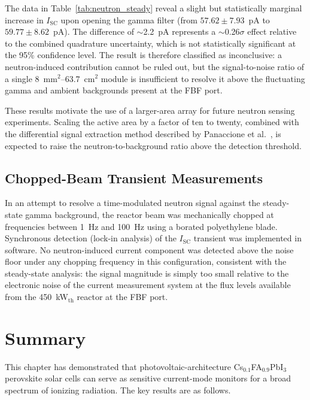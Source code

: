 The data in Table~\ref{tab:neutron_steady} reveal a slight but
statistically marginal increase in $I_{\mathrm{SC}}$ upon opening the gamma
filter (from $57.62 \pm 7.93$~pA to $59.77 \pm 8.62$~pA).  The
difference of $\sim$2.2~pA represents a $\sim$0.26$\sigma$ effect
relative to the combined quadrature uncertainty, which is not
statistically significant at the 95\% confidence level.  The result is
therefore classified as inconclusive: a neutron-induced contribution
cannot be ruled out, but the signal-to-noise ratio of a single
8~mm$^2$--63.7~cm$^2$ module is insufficient to resolve it above the
fluctuating gamma and ambient backgrounds present at the FBF port.

These results motivate the use of a larger-area array for future
neutron sensing experiments.  Scaling the active area by a factor of
ten to twenty, combined with the differential signal extraction method
described by Panaccione et al.~\cite{Panaccione_NIM_2024}, is expected
to raise the neutron-to-background ratio above the detection threshold.

\subsection{Chopped-Beam Transient Measurements}

In an attempt to resolve a time-modulated neutron signal against the
steady-state gamma background, the reactor beam was mechanically
chopped at frequencies between 1~Hz and 100~Hz using a borated
polyethylene blade.  Synchronous detection (lock-in analysis) of the
$I_{\mathrm{SC}}$ transient was implemented in software.  No neutron-induced
current component was detected above the noise floor under any chopping
frequency in this configuration, consistent with the steady-state
analysis: the signal magnitude is simply too small relative to the
electronic noise of the current measurement system at the flux levels
available from the 450~kW$_{\mathrm{th}}$ reactor at the FBF port.
\section{Summary}
\label{sec:ch4_summary}

This chapter has demonstrated that photovoltaic-architecture
Cs$_{0.1}$FA$_{0.9}$PbI$_3$ perovskite solar cells can serve as
sensitive current-mode monitors for a broad spectrum of ionizing
radiation.  The key results are as follows.

